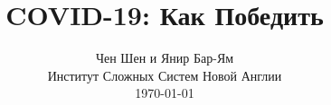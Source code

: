 \documentclass[onecolumn,journal]{IEEEtran}
\begin{document}
\title{\color{Brown} COVID-19: Как Победить \\
\vspace{-0.35ex}}
\author{Чен Шен и Янир Бар-Ям \\ Институт Сложных Систем Новой Англии \\
 \today 
  \vspace{-14ex} \\ 

   
\bigskip
\bigskip

\textbf{}
 }
    
\maketitle


\flushbottom %



\thispagestyle{empty} %




\renewcommand{\thefootnote}{\fnsymbol{footnote}}
\end{document}
